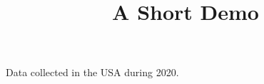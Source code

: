 \documentclass[article]{jss}
\title{A Short Demo}
\begin{document}
Data collected in the USA during 2020.
\end{document}
